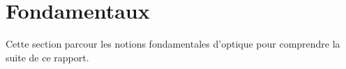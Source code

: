 \section{Fondamentaux}
Cette section parcour les notions fondamentales d'optique pour comprendre la suite de ce rapport.
